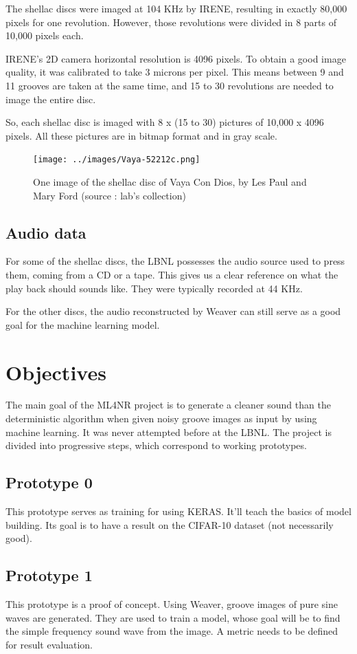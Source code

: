\documentclass[12pt, twoside]{article}
\begin{document}
The shellac discs were imaged at 104 KHz by IRENE, resulting in exactly 80,000 pixels for one revolution. However, those revolutions were divided in 8 parts of 10,000 pixels each. 

IRENE's 2D camera horizontal resolution is 4096 pixels. To obtain a good image quality, it was calibrated to take 3 microns per pixel. This means between 9 and 11 grooves are taken at the same time, and 15 to 30 revolutions are needed to image the entire disc.

So, each shellac disc is imaged with 8 x (15 to 30) pictures of 10,000 x 4096 pixels. All these pictures are in bitmap format and in gray scale.

\begin{figure}
	\centering
	\texttt{[image: ../images/Vaya-52212c.png]}
	\caption{One image of the shellac disc of Vaya Con Dios, by Les Paul and Mary Ford (source : lab's collection)}
	\label{vaya}
\end{figure}
\subsection{Audio data}
For some of the shellac discs, the LBNL possesses the audio source used to press them, coming from a CD or a tape. This gives us a clear reference on what the play back should sounds like. They were typically recorded at 44 KHz.

For the other discs, the audio reconstructed by Weaver can still serve as a good goal for the machine learning model. 

\section{Objectives}
The main goal of the ML4NR project is to generate a cleaner sound than the deterministic algorithm when given noisy groove images as input by using machine learning. It was never attempted before at the LBNL. The project is divided into progressive steps, which correspond to working prototypes.
\subsection{Prototype 0}
This prototype serves as training for using KERAS. It'll teach the basics of model building. Its goal is to have a result on the CIFAR-10 dataset (not necessarily good). 
\subsection{Prototype 1}
This prototype is a proof of concept. Using Weaver, groove images of pure sine waves are generated. They are used to train a model, whose goal will be to find the simple frequency sound wave from the image. A metric needs to be defined for result evaluation.
\end{document}
